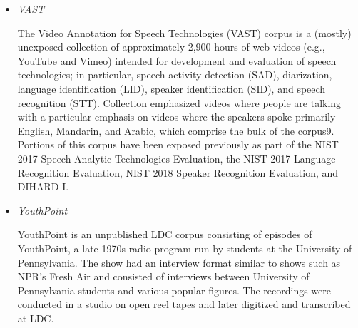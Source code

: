 \begin{itemize}
\item \emph{VAST}

The Video Annotation for Speech Technologies (VAST) corpus is a (mostly) unexposed collection of approximately 2,900 hours of web videos (e.g., YouTube and Vimeo) intended for development and evaluation of speech technologies; in particular, speech activity detection (SAD), diarization, language identification (LID), speaker identification (SID), and speech recognition (STT). Collection emphasized videos where people are talking with a particular emphasis on videos where the speakers spoke primarily English, Mandarin, and Arabic, which comprise the bulk of the corpus9. Portions of this corpus have been exposed previously as part of the NIST 2017 Speech Analytic Technologies Evaluation, the NIST 2017 Language Recognition Evaluation, NIST 2018 Speaker Recognition Evaluation, and DIHARD I.

\item \emph{YouthPoint}

YouthPoint is an unpublished LDC corpus consisting of episodes of YouthPoint, a late 1970s radio program run by students at the University of Pennsylvania. The show had an interview format similar to shows such as NPR’s Fresh Air and consisted of interviews between University of Pennsylvania students and various popular figures. The recordings were conducted in a studio on open reel tapes and later digitized and transcribed at LDC.

\end{itemize}